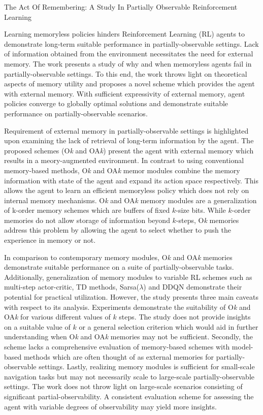 \documentclass[11pt,letterpaper]{article}
\begin{document}
\begin{center}
  \large{The Act Of Remembering: A Study In Partially Observable Reinforcement Learning}
\end{center}

Learning memoryless policies hinders Reinforcement Learning (RL) agents to demonstrate long-term suitable performance in partially-observable settings. Lack of information obtained from the environment necessitates the need for external memory. The work presents a study of why and when memoryless agents fail in partially-observable settings. To this end, the work throws light on theoretical aspects of memory utility and proposes a novel scheme which provides the agent with external memory. With sufficient expressivity of external memory, agent policies converge to globally optimal solutions and demonstrate suitable performance on partially-observable scenarios. 

Requirement of external memory in partially-observable settings is highlighted upon examining the lack of retrieval of long-term information by the agent. The proposed schemes (O\textit{k} and OA\textit{k}) present the agent with external memory which results in a meory-augmented environment. In contrast to using conventional memory-based methods, O\textit{k} and OA\textit{k} memor modules combine the memory information with state of the agent and expand its action space respectively. This allows the agent to learn an efficient memoryless policy which does not rely on internal memory mechanisms. O\textit{k} and OA\textit{k} memory modules are a generalization of k-order memory schemes which are buffers of fixed $k$-size bits. While $k$-order memories do not allow storage of information beyond $k$-steps, O\textit{k} memories address this problem by allowing the agent to select whether to push the experience in memory or not.

In comparison to contemporary memory modules, O\textit{k} and OA\textit{k} memories demonstrate suitable performance on a suite of partially-observable tasks. Additionally, generalization of memory modules to variable RL schemes such as multi-step actor-critic, TD methods, Sarsa($\lambda$) and DDQN demonstrate their potential for practical utilization. However, the study presents three main caveats with respect to its analysis. Experiments demonstrate the suitability of O\textit{k} and OA\textit{k} for various different values of $k$ steps. The study does not provide insights on a suitable value of $k$ or a general selection criterion which would aid in further understanding when O\textit{k} and OA\textit{k} memories may not be sufficient. Secondly, the scheme lacks a comprehensive evaluation of memory-based schemes with model-based methods which are often thought of as external memories for partially-observable settings. Lastly, realizing memory modules is sufficient for small-scale navigation tasks but may not necessarily scale to large-scale partially-observable settings. The work does not throw light on large-scale scenarios consisting of significant partial-observability. A consistent evaluation scheme for assessing the agent with variable degrees of observability may yield more insights. 
\end{document}
